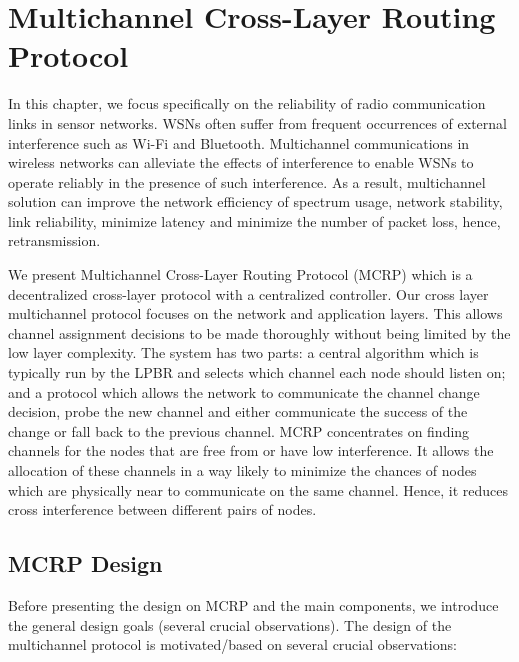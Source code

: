 \chapter{Multichannel Cross-Layer Routing Protocol}
\label{MCRP}

In this chapter, we focus specifically on the reliability of radio communication links in sensor networks. WSNs often suffer from frequent occurrences of external interference such as Wi-Fi and Bluetooth. %
Multichannel communications in wireless networks can alleviate the effects of interference to enable WSNs to operate reliably in the presence of such interference. As a result, multichannel solution can improve the network efficiency of spectrum usage, network stability, link reliability, minimize latency and minimize the number of packet loss, hence, retransmission.

We present Multichannel Cross-Layer Routing Protocol (MCRP) which is a decentralized cross-layer protocol with a centralized controller. Our cross layer multichannel protocol focuses on the network and application layers. This allows channel assignment decisions to be made thoroughly without being limited by the low layer complexity. The system has two parts: a central algorithm which is typically run by the LPBR and selects which channel each node should listen on; and a protocol which allows the network to communicate the channel change decision, probe the new channel and either communicate the success of the change or fall back to the previous channel. MCRP concentrates on finding channels for the nodes that are free from or have low interference. It allows the allocation of these channels in a way likely to minimize the chances of nodes which are physically near to communicate on the same channel. Hence, it reduces cross interference between different pairs of nodes.

\section{MCRP Design}
Before presenting the design on MCRP and the main components, we introduce the general design goals (several crucial observations). The design of the multichannel protocol is motivated/based on several crucial observations: 

